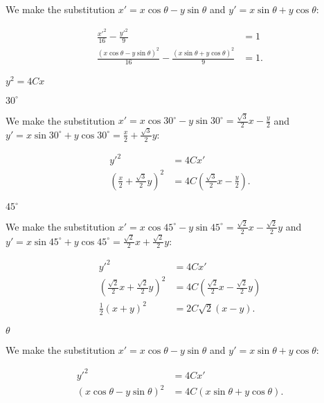 \documentclass[../gatm_answers.tex]{subfiles}
\begin{document}
\noindent We make the substitution $x'=x \cos \theta - y\sin \theta$ and $y'=x\sin \theta + y\cos \theta$:

\begin{align*}
\frac{x'^2}{16}-\frac{y'^2}{9} &= 1 \\
\frac{\left(x \cos \theta - y\sin \theta\right)^2}{16} - \frac{\left(x\sin \theta + y\cos \theta\right)^2}{9} &= 1.
\end{align*}

\begin{inner_problem}
\item $y^2=4Cx$
\end{inner_problem}

\begin{iinner_problem}[start=1]
\item $30^\circ$
\end{iinner_problem}

\noindent We make the substitution $x'=x \cos 30^\circ - y\sin 30^\circ=\frac{\sqrt{3}}{2}x-\frac{y}{2}$ and $y'=x\sin 30^\circ + y\cos 30^\circ=\frac{x}{2}+\frac{\sqrt{3}}{2}y$:

\begin{align*}
y'^2&=4Cx' \\
\left(\frac{x}{2}+\frac{\sqrt{3}}{2}y\right)^2 &= 4C\left(\frac{\sqrt{3}}{2}x-\frac{y}{2}\right).
\end{align*}

\begin{iinner_problem}
\item $45^\circ$
\end{iinner_problem}

\noindent We make the substitution $x'=x \cos 45^\circ - y\sin 45^\circ=\frac{\sqrt{2}}{2}x-\frac{\sqrt{2}}{2}y$ and $y'=x\sin 45^\circ + y\cos 45^\circ=\frac{\sqrt{2}}{2}x+\frac{\sqrt{2}}{2}y$:

\begin{align*}
y'^2&=4Cx' \\
\left(\frac{\sqrt{2}}{2}x+\frac{\sqrt{2}}{2}y\right)^2 &= 4C\left(\frac{\sqrt{2}}{2}x-\frac{\sqrt{2}}{2}y\right) \\
\frac{1}{2}(x+y)^2 &= 2C\sqrt{2}(x-y).
\end{align*}

\begin{iinner_problem}
\item $\theta$
\end{iinner_problem}

We make the substitution $x'=x \cos \theta - y\sin \theta$ and $y'=x\sin \theta + y\cos \theta$:

\begin{align*}
y'^2&=4Cx' \\
\left(x \cos \theta - y\sin \theta\right)^2 &= 4C\left(x\sin \theta + y\cos \theta\right).
\end{align*}
\end{document}
